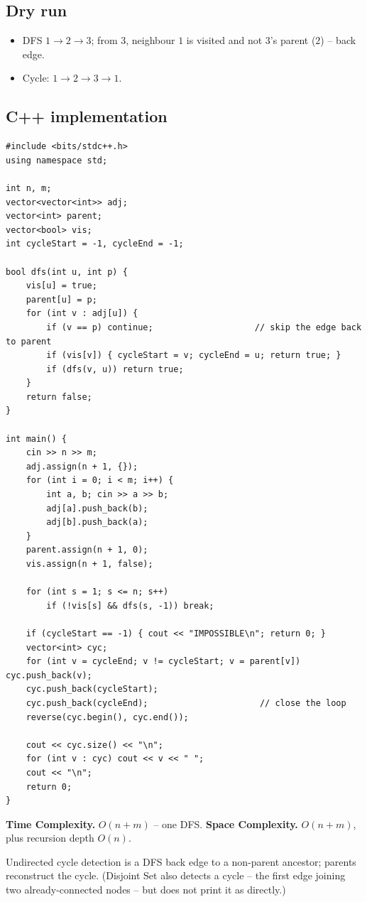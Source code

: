\subsection*{Dry run}


\begin{itemize}
  \item DFS $1\to2\to3$; from $3$, neighbour $1$ is visited and not
        $3$'s parent ($2$) -- back edge.
  \item Cycle: $1\to2\to3\to1$.
\end{itemize}

\subsection*{C++ implementation}

\begin{lstlisting}
#include <bits/stdc++.h>
using namespace std;

int n, m;
vector<vector<int>> adj;
vector<int> parent;
vector<bool> vis;
int cycleStart = -1, cycleEnd = -1;

bool dfs(int u, int p) {
    vis[u] = true;
    parent[u] = p;
    for (int v : adj[u]) {
        if (v == p) continue;                    // skip the edge back to parent
        if (vis[v]) { cycleStart = v; cycleEnd = u; return true; }
        if (dfs(v, u)) return true;
    }
    return false;
}

int main() {
    cin >> n >> m;
    adj.assign(n + 1, {});
    for (int i = 0; i < m; i++) {
        int a, b; cin >> a >> b;
        adj[a].push_back(b);
        adj[b].push_back(a);
    }
    parent.assign(n + 1, 0);
    vis.assign(n + 1, false);

    for (int s = 1; s <= n; s++)
        if (!vis[s] && dfs(s, -1)) break;

    if (cycleStart == -1) { cout << "IMPOSSIBLE\n"; return 0; }
    vector<int> cyc;
    for (int v = cycleEnd; v != cycleStart; v = parent[v]) cyc.push_back(v);
    cyc.push_back(cycleStart);
    cyc.push_back(cycleEnd);                      // close the loop
    reverse(cyc.begin(), cyc.end());

    cout << cyc.size() << "\n";
    for (int v : cyc) cout << v << " ";
    cout << "\n";
    return 0;
}
\end{lstlisting}

\begin{complexitybox}
\textbf{Time Complexity.} $O(n+m)$ -- one DFS. \textbf{Space Complexity.}
$O(n+m)$, plus recursion depth $O(n)$.
\end{complexitybox}

\begin{takeawaybox}
Undirected cycle detection is a DFS back edge to a non-parent ancestor;
parents reconstruct the cycle. (Disjoint Set also detects a cycle -- the
first edge joining two already-connected nodes -- but does not print it as
directly.)
\end{takeawaybox}
